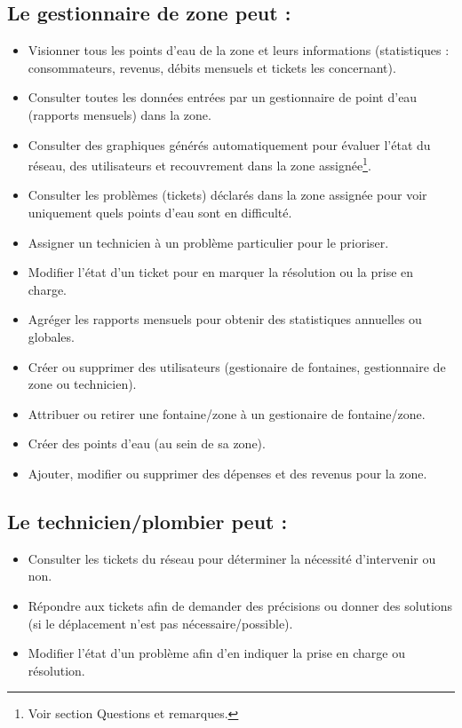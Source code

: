 \documentclass[a4paper, 11pt]{article}
\begin{document}
\subsection{Le gestionnaire de zone peut :}
\begin{itemize}
  \item Visionner tous les points d'eau de la zone et leurs informations (statistiques : consommateurs, revenus, débits mensuels et tickets les concernant).
  \item Consulter toutes les données entrées par un gestionnaire de point d'eau (rapports mensuels) dans la zone.
  \item Consulter des graphiques générés automatiquement pour évaluer l'état du réseau, des utilisateurs et recouvrement dans la zone assignée\footnote{Voir section Questions et remarques.}.
  \item Consulter les problèmes (tickets) déclarés dans la zone assignée pour voir uniquement quels points d'eau sont en difficulté.
  \item Assigner un technicien à un problème particulier pour le prioriser.
  \item Modifier l'état d'un ticket pour en marquer la résolution ou la prise en charge.
  \item Agréger les rapports mensuels pour obtenir des statistiques annuelles ou globales. %
  \item Créer ou supprimer des utilisateurs (gestionaire de fontaines, gestionnaire de zone ou technicien). %
  \item Attribuer ou retirer une fontaine/zone à un gestionaire de fontaine/zone.
  \item Créer des points d'eau (au sein de sa zone).
  \item Ajouter, modifier ou supprimer des dépenses et des revenus pour la zone.
\end{itemize}

\subsection{Le technicien/plombier peut :}
\begin{itemize}
  \item Consulter les tickets du réseau pour déterminer la nécessité d'intervenir ou non.
  \item Répondre aux tickets afin de demander des précisions ou donner des solutions (si le déplacement n'est pas nécessaire/possible).
  \item Modifier l'état d'un problème afin d'en indiquer la prise en charge ou résolution.
\end{itemize}
\end{document}
